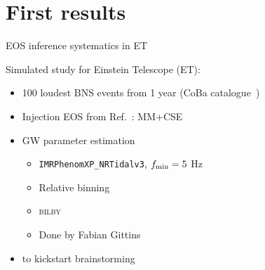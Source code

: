 \documentclass[usenames,dvipsnames,t]{beamer}
\begin{document}
\section{First results}

\begin{frame}{EOS inference systematics in ET}
  \def\x{6mm}
  \def\y{2mm}

  Simulated study for Einstein Telescope (ET):
  \begin{itemize}
    \vspace{\y}
    \item 100 loudest BNS events from 1 year (CoBa catalogue~\cite{Branchesi:2023mws})
    
    \vspace{\y}
    
    \item Injection EOS from Ref.~\cite{Koehn:2024set}: MM+CSE
    
    \vspace{\y}
    
    \item GW parameter estimation
    \begin{itemize}
      \item \texttt{IMRPhenomXP\_NRTidalv3}, $f_{\rm{min}} = 5$ Hz
      \item Relative binning
      \item \textsc{bilby}
      \item Done by Fabian Gittins
    \end{itemize}

    \vspace{\y}

    \item {} to kickstart brainstorming

  \end{itemize}
\end{frame}
\end{document}
